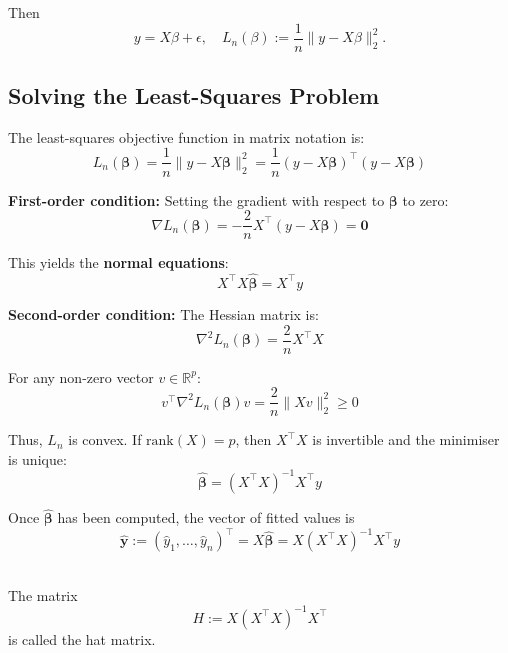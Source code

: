 Then
\begin{equation*}
    y = X\beta + \epsilon, \quad L_n(\beta) := \frac{1}{n} \lVert y - X\beta \rVert_2^2.
\end{equation*}

\subsection*{Solving the Least-Squares Problem}

The least-squares objective function in matrix notation is:
\begin{equation*}
    L_n(\bm\beta) = \frac{1}{n} \|y - X\bm\beta\|_2^2 = \frac{1}{n}(y - X\bm\beta)^\top (y - X\bm\beta)
\end{equation*}

\textbf{First-order condition:} Setting the gradient with respect to $\bm\beta$ to zero:
\begin{equation*}
    \nabla L_n(\bm\beta) = -\frac{2}{n} X^\top (y - X\bm\beta) = \mathbf{0}
\end{equation*}

This yields the \textbf{normal equations}:
\begin{equation*}
    X^\top X \hat{\bm\beta} = X^\top y
\end{equation*}

\textbf{Second-order condition:} The Hessian matrix is:
\begin{equation*}
    \nabla^2 L_n(\bm\beta) = \frac{2}{n} X^\top X
\end{equation*}

For any non-zero vector $v \in \mathbb{R}^p$:
\begin{equation*}
    v^\top \nabla^2 L_n(\bm\beta) v = \frac{2}{n} \|Xv\|_2^2 \geq 0
\end{equation*}

Thus, $L_n$ is convex. If $\text{rank}(X)=p$, then $X^\top X$ is invertible and the minimiser is unique:
\begin{equation*}
    \hat{\bm\beta} = (X^\top X)^{-1} X^\top y
\end{equation*}

Once $\hat{\bm\beta}$ has been computed, the vector of fitted values is
\begin{equation*}
    \hat{\bm{y}} :=   (\hat{y}_1,\dots,\hat{y}_n)^\top=X\hat{\bm\beta}= X(X^\top X)^{-1} X^\top y
\end{equation*}

\begin{definition} \leavevmode\\
    The matrix
    \begin{equation*}
        H:=X(X^\top X)^{-1} X^\top
    \end{equation*}
    is called the hat matrix.
\end{definition}


